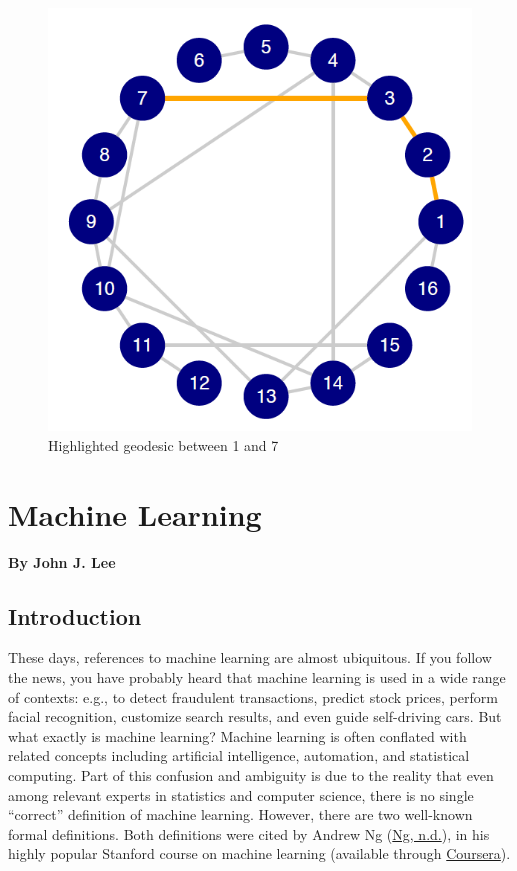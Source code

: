\documentclass{book}
\begin{document}
\begin{figure}
\hypertarget{fig:fig11-16}{%
\centering
\includegraphics{images/social-networks/11-16.png}
\caption{Highlighted geodesic between 1 and 7}\label{fig:fig11-16}
}
\end{figure}

\hypertarget{machine-learning}{%
\chapter{Machine Learning}\label{machine-learning}}

\textbf{By John J. Lee}

\hypertarget{introduction-9}{%
\section{Introduction}\label{introduction-9}}

These days, references to machine learning are almost ubiquitous. If you
follow the news, you have probably heard that machine learning is used in a
wide range of contexts: e.g., to detect fraudulent transactions, predict stock
prices, perform facial recognition, customize search results, and even guide
self-driving cars. But what exactly is machine learning? Machine learning is
often conflated with related concepts including artificial intelligence,
automation, and statistical computing. Part of this confusion and ambiguity is
due to the reality that even among relevant experts in statistics and computer
science, there is no single ``correct'' definition of machine learning.
However, there are two well-known formal definitions. Both definitions were
cited by Andrew Ng (\protect\hyperlink{ref-ng-a}{Ng, n.d.}), in his highly
popular Stanford course on machine learning (available through
\href{https://www.coursera.org/learn/machine-learning}{Coursera}).
\end{document}
